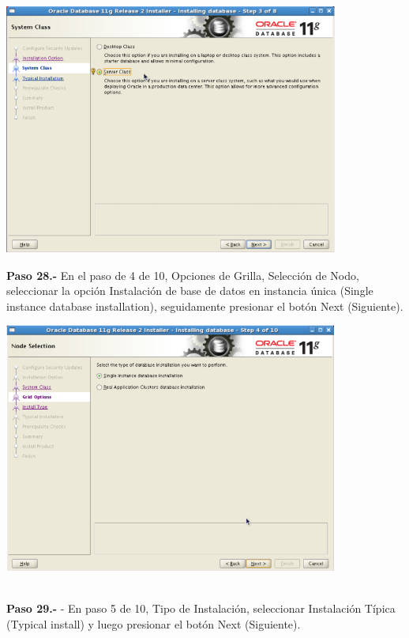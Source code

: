 \begin{enumerate}
\begin{center}
  \includegraphics[width=11cm]{Imagenes/Oracle_Database/Paso_27.png}
\end{center}
\break

\textbf {Paso 28.-} En el paso de 4 de 10, Opciones de Grilla, Selección de Nodo, seleccionar la opción Instalación de base de
datos en instancia única (Single instance database installation), seguidamente presionar el botón Next
(Siguiente).

\begin{center}
  \includegraphics[width=11cm]{Imagenes/Oracle_Database/Paso_28.png}
\end{center}
\vspace{12pt}\\

\textbf {Paso 29.-} - En paso 5 de 10, Tipo de Instalación, seleccionar Instalación Típica (Typical install) y luego presionar el botón Next (Siguiente).


\end{enumerate}
